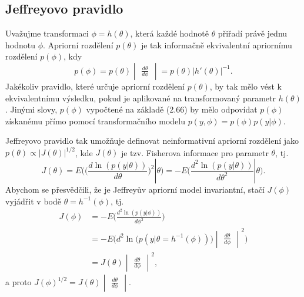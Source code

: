 \subsection{Jeffreyovo pravidlo}

Uvažujme transformaci $\phi = h(\theta)$, která každé hodnotě $\theta$ přiřadí právě jednu hodnotu $\phi$. Apriorní rozdělení $p(\theta)$ je tak informačně ekvivalentní apriornímu rozdělení $p(\phi)$, kdy
\begin{equation}
p(\phi) = p(\theta) \begin{vmatrix}\frac{d \theta}{d \phi}\end{vmatrix} = p(\theta) | h'(\theta)|^{-1}.
\end{equation}
Jakékoliv pravidlo, které určuje apriorní rozdělení $p(\theta)$, by tak mělo vést k ekvivalentnímu výsledku, pokud je aplikované na transformovaný parametr $h(\theta)$. Jinými slovy, $p(\phi)$ vypočtené na základě (2.66) by mělo odpovídat $p(\phi)$ získanému přímo pomocí transformačního modelu $p(y, \phi) = p(\phi)p(y | \phi)$.

Jeffreyovo pravidlo tak umožňuje definovat neinformativní apriorní rozdělení jako $p(\theta) \varpropto |J(\theta)|^{1/2}$, kde $J(\theta)$ je tzv. Fisherova informace pro parametr $\theta$, tj.
\begin{equation}
J(\theta) = E\Big(\Big(\frac{d \ln(p(y | \theta))}{d \theta}\Big)^2 | \theta \Big) = - E\Big(\frac{d^2 \ln(p(y | \theta))}{d \theta^2} | \theta \Big).
\end{equation}
Abychom se přesvědčili, že je Jeffreyův apriorní model invariantní, stačí $J(\phi)$ vyjádřit v bodě $\theta = h^{-1}(\phi)$, tj.
\begin{equation}
\begin{split}
J(\phi) & =  - E\Big(\frac{d^2 \ln(p(y|\phi))}{d \phi^2}\Big)\\
 & = - E\Big({d^2 \ln \big(p(y|\theta = h^{-1}(\phi))\big)}\begin{vmatrix}\frac{d \theta}{d \phi}\end{vmatrix}^2\Big)\\
 & = J(\theta)\begin{vmatrix}\frac{d \theta}{d \phi}\end{vmatrix}^2,
\end{split}
\end{equation}
a proto $J(\phi)^{1/2} = J(\theta)\begin{vmatrix}\frac{d \theta}{d \phi}\end{vmatrix}$.

